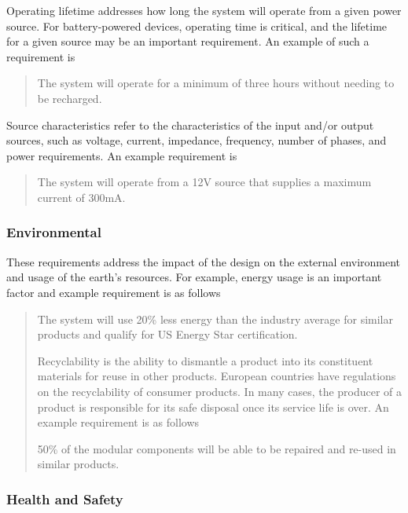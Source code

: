 Operating lifetime addresses how long the system will operate from a
given power source. For battery-powered devices, operating time is
critical, and the lifetime for a given source may be an important
requirement. An example of such a requirement is

\begin{quote}
The system will operate for a minimum of three hours without needing to
be recharged.
\end{quote}

Source characteristics refer to the characteristics of the input and/or
output sources, such as voltage, current, impedance, frequency, number
of phases, and power requirements. An example requirement is

\begin{quote}
The system will operate from a 12V source that supplies a maximum
current of 300mA.
\end{quote}

\subsubsection*{Environmental}\label{environmental}

These requirements address the impact of the design on the external
environment and usage of the earth's resources. For example, energy
usage is an important factor and example requirement is as follows

\begin{quote}
The system will use 20\% less energy than the industry average for
similar products and qualify for US Energy Star certification.

Recyclability is the ability to dismantle a product into its constituent
materials for reuse in other products. European countries have
regulations on the recyclability of consumer products. In many cases,
the producer of a product is responsible for its safe disposal once its
service life is over. An example requirement is as follows

50\% of the modular components will be able to be repaired and re-used
in similar products.
\end{quote}

\subsubsection*{Health and Safety}\label{health-and-safety}

